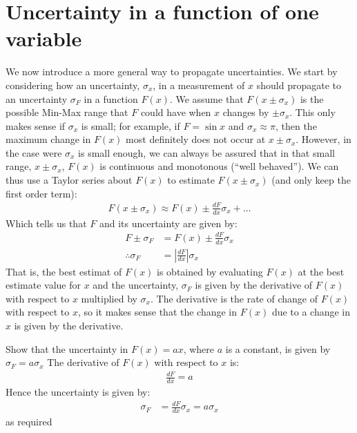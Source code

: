 \section{Uncertainty in a function of one variable}
We now introduce a more general way to propagate uncertainties. We start by considering how an uncertainty, $\sigma_{x}$, in a measurement of $x$ should propagate to an uncertainty $\sigma_{F}$ in a function $F(x)$. We assume that $F(x \pm \sigma_{x})$ is the possible Min-Max range that $F$ could have when $x$ changes by $\pm\sigma_{x}$. This only makes sense if $\sigma_{x}$ is small; for example, if $F=\sin x$ and $\sigma_{x} \approx \pi$, then the maximum change in $F(x)$ most definitely does not occur at $x\pm\sigma_{x}$. However, in the case were $\sigma_{x}$ is small enough, we can always be assured that in that small range, $x\pm\sigma_{x}$,  $F(x)$ is continuous and monotonous (``well behaved''). We can thus use a Taylor series about $F(x)$ to estimate $F(x\pm\sigma_{x})$ (and only keep the first order term):
\begin{align}
F(x\pm\sigma_{x})\approx F(x)\pm\frac{dF}{dx}\sigma_{x}+\dots
\end{align}
Which tells us that $F$ and its uncertainty are given by:
\begin{align}
F \pm \sigma_{F} &= F(x) \pm \frac{dF}{dx}\sigma_{x}\nonumber\\
\therefore \sigma_{F}&=\left|\frac{dF}{dx}\right| \sigma_{x}
\end{align}
That is, the best estimat of $F(x)$ is obtained by evaluating $F(x)$ at the best estimate value for $x$ and the uncertainty, $\sigma_{F}$ is given by the derivative of $F(x)$ with respect to $x$ multiplied by $\sigma_{x}$.  The derivative is the rate of change of $F(x)$ with respect to $x$, so it makes sense that the change in $F(x)$ due to a change in $x$ is given by the derivative.

\begin{example}{}{Show that the uncertainty in $F(x)=ax$, where $a$ is a constant, is given by $\sigma_{F}=a \sigma_{x}$}{}
The derivative of $F(x)$ with respect to $x$ is:
\begin{align*}
\frac{dF}{dx}=a
\end{align*}
Hence the uncertainty is given by:
\begin{align*}
\sigma_{F}&=\frac{dF}{dx} \sigma_{x}=a \sigma_{x}
\end{align*}
as required
\end{example}

